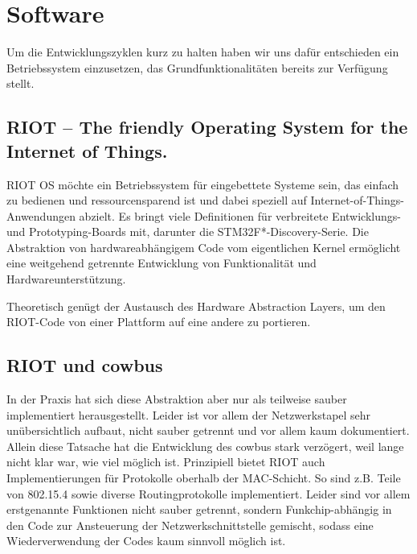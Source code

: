 \documentclass{IEEEtran}
\begin{document}
\section{Software}
    Um die Entwicklungszyklen kurz zu halten haben wir uns dafür entschieden
    ein Betriebssystem einzusetzen, das Grundfunktionalitäten bereits
    zur Verfügung stellt.

    \subsection{RIOT -- The friendly Operating System for the Internet of Things.\cite{RIOT}}
        RIOT OS möchte ein Betriebssystem für eingebettete Systeme sein,
        das einfach zu bedienen und ressourcensparend ist und dabei speziell
        auf Internet-of-Things-Anwendungen abzielt. Es bringt viele Definitionen
        für verbreitete Entwicklungs- und Prototyping-Boards mit, darunter die
        STM32F*-Discovery-Serie.
        Die Abstraktion von hardwareabhängigem Code vom eigentlichen Kernel
        ermöglicht eine weitgehend getrennte Entwicklung von Funktionalität und
        Hardwareunterstützung.

        Theoretisch genügt der Austausch des Hardware Abstraction Layers,
        um den RIOT-Code von einer Plattform auf eine andere zu portieren.

    \subsection{RIOT und cowbus}
        In der Praxis hat sich diese Abstraktion aber nur als teilweise sauber
        implementiert herausgestellt. Leider ist vor allem der Netzwerkstapel
        sehr unübersichtlich aufbaut, nicht sauber getrennt und vor allem kaum
        dokumentiert. Allein diese Tatsache hat die Entwicklung des cowbus stark
        verzögert, weil lange nicht klar war, wie viel möglich ist.
        Prinzipiell bietet RIOT auch Implementierungen für Protokolle oberhalb
        der MAC-Schicht. So sind z.B. Teile von 802.15.4 sowie diverse
        Routingprotokolle implementiert. Leider sind vor allem erstgenannte
        Funktionen nicht sauber getrennt, sondern Funkchip-abhängig in den
        Code zur Ansteuerung der Netzwerkschnittstelle gemischt, sodass eine
        Wiederverwendung der Codes kaum sinnvoll möglich ist.
\end{document}

